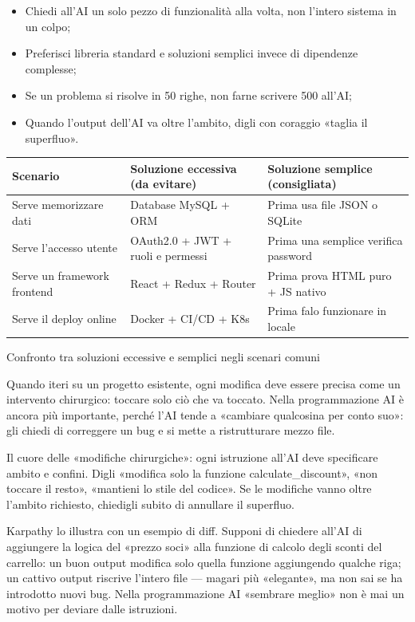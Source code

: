\begin{itemize}
  \item Chiedi all'AI un solo pezzo di funzionalità alla volta, non l'intero sistema in un colpo;
  \item Preferisci libreria standard e soluzioni semplici invece di dipendenze complesse;
  \item Se un problema si risolve in 50 righe, non farne scrivere 500 all'AI;
  \item Quando l'output dell'AI va oltre l'ambito, digli con coraggio «taglia il superfluo».
\end{itemize}

\begin{center}
\begin{tabularx}{\linewidth}{|X|X|X|}
\hline
\textbf{Scenario} & \textbf{Soluzione eccessiva (da evitare)} & \textbf{Soluzione semplice (consigliata)} \tabularnewline
\hline
Serve memorizzare dati & Database MySQL + ORM & Prima usa file JSON o SQLite \tabularnewline
Serve l'accesso utente & OAuth2.0 + JWT + ruoli e permessi & Prima una semplice verifica password \tabularnewline
Serve un framework frontend & React + Redux + Router & Prima prova HTML puro + JS nativo \tabularnewline
Serve il deploy online & Docker + CI/CD + K8s & Prima falo funzionare in locale \tabularnewline
\hline
\end{tabularx}
\end{center}

\begin{center}\small\color{gray}Confronto tra soluzioni eccessive e semplici negli scenari comuni\end{center}


Quando iteri su un progetto esistente, ogni modifica deve essere precisa come un intervento chirurgico: toccare solo ciò che va toccato. Nella programmazione AI è ancora più importante, perché l'AI tende a «cambiare qualcosina per conto suo»: gli chiedi di correggere un bug e si mette a ristrutturare mezzo file.

Il cuore delle «modifiche chirurgiche»: ogni istruzione all'AI deve specificare ambito e confini. Digli «modifica solo la funzione calculate\_discount», «non toccare il resto», «mantieni lo stile del codice». Se le modifiche vanno oltre l'ambito richiesto, chiedigli subito di annullare il superfluo.

Karpathy lo illustra con un esempio di diff. Supponi di chiedere all'AI di aggiungere la logica del «prezzo soci» alla funzione di calcolo degli sconti del carrello: un buon output modifica solo quella funzione aggiungendo qualche riga; un cattivo output riscrive l'intero file — magari più «elegante», ma non sai se ha introdotto nuovi bug. Nella programmazione AI «sembrare meglio» non è mai un motivo per deviare dalle istruzioni.

